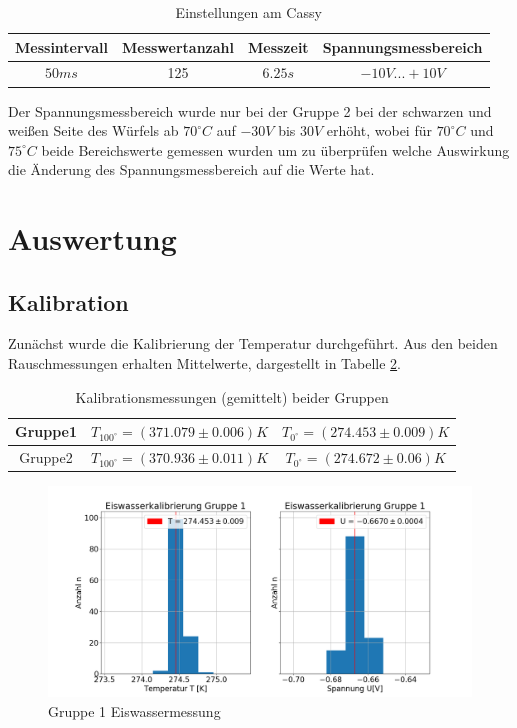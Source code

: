 \documentclass[a4paper, 11pt]{article}
\begin{document}
\begin{table}[h]
\centering
	\begin{tabular}{|c|c|c|c|}
	\hline Messintervall & Messwertanzahl & Messzeit & Spannungsmessbereich \\
	\hline $50ms$& 125& $6.25s$& $-10V...+10V$ \\
	\hline
	\end{tabular}
\caption{Einstellungen am Cassy}
\label{table:Einstellungen}
\end{table}

Der Spannungsmessbereich wurde nur bei der Gruppe 2 bei der schwarzen und weißen Seite des Würfels ab $70^\circ C$ auf $-30V$ bis $30 V$ erhöht, wobei für $70^\circ C$ und $75^\circ C$ beide Bereichswerte gemessen wurden um zu überprüfen welche Auswirkung die Änderung des Spannungsmessbereich auf die Werte hat.


\newpage
\section{Auswertung}
\subsection{Kalibration}
Zunächst wurde die Kalibrierung der Temperatur durchgeführt. Aus den beiden Rauschmessungen erhalten Mittelwerte, dargestellt in Tabelle \ref{table:Kalibrationsmessungen}.

\begin{table}[h]
\centering
	\begin{tabular}{|c|c|c|}
	\hline Gruppe1 & $T_{100^\circ}= (371.079 \pm 0.006)  K$ & $T_{0^\circ}=  (274.453 \pm 0.009) K$\\
	\hline Gruppe2 & $T_{100^\circ}=  (370.936 \pm 0.011) K$ & $T_{0^\circ}=(274.672 \pm 0.06)   K$\\
	\hline
	\end{tabular}
\caption{Kalibrationsmessungen (gemittelt) beider Gruppen}
\label{table:Kalibrationsmessungen}
\end{table}

\begin{figure}[H]
	\includegraphics[scale=0.4]{Bilder/Gruppe1_Eiswasser.png}%
	\caption[Gruppe 1 Eiswassermessung]{Gruppe 1 Eiswassermessung}%
	\label{pic:G1Eismessung}%
\end{figure}
\end{document}
